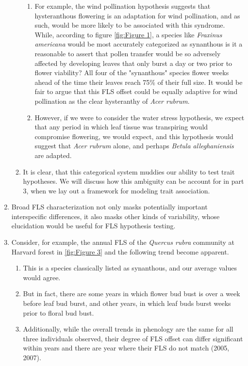\documentclass{article}
\begin{document}
\begin{enumerate}
\begin{enumerate}
 \begin{enumerate}
     \item For example, the wind pollination hypothesis suggests that hysteranthous flowering is an adaptation for wind pollination, and as such, would be more likely to be associated with this syndrome. While, according to figure \ref{fig:Figure 1}, a species like \textit{Fraxinus americana} would be most accurately categorized as synanthous is it a reasonable to assert that pollen transfer would be so adversely affected by developing leaves that only burst a day or two prior to flower viability? All four of the "synanthous" species flower weeks ahead of the time their leaves reach 75\% of their full size. It would be fair to argue that this FLS offset could be equally adaptive for wind pollination as the clear hysteranthy of \textit{Acer rubrum}.
     \item However, if we were to consider the water stress hypothesis, we expect that any period in which leaf tissue was transpiring would compromise flowering, we would expect, and this hypothesis would suggest that \textit{Acer rubrum} alone, and perhaps \textit{Betula alleghaniensis} are adapted.
 \end{enumerate}
  \item It is clear, that this categorical system muddies our ability to test trait hypotheses. We will discuss how this ambiguity can be account for in part 3, when we lay out a framework for modeling trait association. 
  \end{enumerate}
    
 \item Broad FLS characterization not only masks potentially important interspecific differences, it also masks other kinds of  variability, whose elucidation would be useful for FLS hypothesis testing.
        \item Consider, for example, the annual FLS of the \textit{Quercus rubra} community at Harvard forest in \ref{fig:Figure 3} and the following trend become apparent.
        
        \begin{enumerate}
        \item  This is a species classically listed as synanthous, and our average values would agree.
        \item But in fact, there are some years in which flower bud bust is over a week before leaf bud burst, and other years, in which leaf buds burst weeks prior to floral bud bust.
        \item Additionally, while the overall trends in phenology are the same for all three individuals observed, their degree of FLS offset can differ significant within years and there are year where their FLS do not match (2005, 2007).
    \end{enumerate}
 

\end{enumerate}
\end{document}
